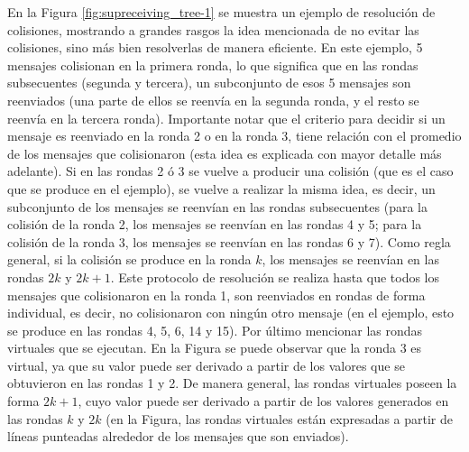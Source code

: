 En la Figura \ref{fig:supreceiving_tree-1} se muestra un ejemplo de resolución de colisiones, 
mostrando a grandes rasgos la idea mencionada de no evitar las colisiones, sino más bien 
resolverlas de manera eficiente. En este ejemplo, 5 mensajes colisionan en la primera ronda, 
lo que significa que en las rondas subsecuentes (segunda y tercera), un subconjunto de 
esos 5 mensajes son reenviados (una parte de ellos se reenvía en la segunda ronda, y el resto 
se reenvía en la tercera ronda). Importante notar que el criterio para decidir si un mensaje 
es reenviado en la ronda 2 o en la ronda 3, tiene relación con el promedio de los mensajes 
que colisionaron (esta idea es explicada con mayor detalle más adelante). Si en las rondas 
2 ó 3 se vuelve a producir una colisión (que es el caso que se produce en el ejemplo), se vuelve 
a realizar la misma idea, es decir, un subconjunto de los mensajes se reenvían en las rondas 
subsecuentes (para la colisión de la ronda 2, los mensajes se reenvían en las rondas 4 y 5; para 
la colisión de la ronda 3, los mensajes se reenvían en las rondas 6 y 7). Como regla general, si 
la colisión se produce en la ronda $k$, los mensajes se reenvían en las rondas $2k$ y $2k + 1$. 
Este protocolo de resolución se realiza hasta que todos los mensajes que colisionaron en la ronda 
1, son reenviados en rondas de forma individual, es decir, no colisionaron con ningún otro 
mensaje (en el ejemplo, esto se produce en las rondas 4, 5, 6, 14 y 15). Por último mencionar 
las rondas virtuales que se ejecutan. En la Figura se puede observar que la ronda 3 es virtual, ya que 
su valor puede ser derivado a partir de los valores que se obtuvieron en las rondas 1 y 2. De manera 
general, las rondas virtuales poseen la forma $2k + 1$, cuyo valor puede ser derivado a partir de 
los valores generados en las rondas $k$ y $2k$ (en la Figura, las rondas virtuales están expresadas 
a partir de líneas punteadas alrededor de los mensajes que son enviados).

